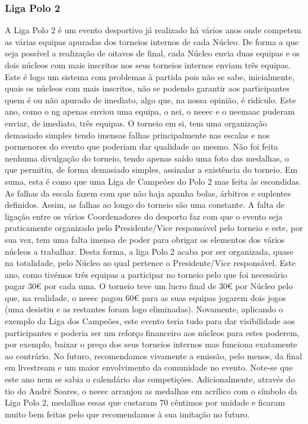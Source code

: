 
\subsubsection{Liga Polo 2}

A Liga Polo 2 é um evento desportivo já realizado há vários anos onde competem as várias equipas apuradas dos torneios internos de cada Núcleo. De forma a que seja possível a realização de oitavos de final, cada Núcleo envia duas equipas e os dois núcleos com mais inscritos nos seus torneios internos enviam três equipas. Este é logo um sistema com problemas à partida pois não se sabe, inicialmente, quais os núcleos com mais inscritos, não se podendo garantir aos participantes quem é ou não apurado de imediato, algo que, na nossa opinião, é ridículo. Este ano, como o \acrshort{ng} apenas enviou uma equipa, o \acrshort{nei}, o \acrshort{neeec} e o \acrshort{neemaac} puderam enviar, de imediato, três equipas. O torneio em si, tem uma organização demasiado simples tendo imensas falhas principalmente nas escalas e nos pormenores do evento que poderiam dar qualidade ao mesmo. Não foi feita nenhuma divulgação do torneio, tendo apenas saído uma foto das medalhas, o que permitiu, de forma demasiado simples, assinalar a existência do torneio. Em suma, esta é como que uma Liga de Campeões do Polo 2 mas feita às escondidas. As falhas da escala fazem com que não haja apanha bolas, árbitros e suplentes definidos. Assim, as falhas ao longo do torneio são uma constante. A falta de ligação entre os vários Coordenadores do desporto faz com que o evento seja praticamente organizado pelo Presidente/Vice responsável pelo torneio e este, por sua vez, tem uma falta imensa de poder para obrigar os elementos dos vários núcleos a trabalhar. Desta forma, a liga Polo 2 acaba por ser organizada, quase na totalidade, pelo Núcleo ao qual pertence o Presidente/Vice responsável. Este ano, como tivémos três equipas a participar no torneio pelo que foi necessário pagar 30€ por cada uma. O torneio teve um lucro final de 30€ por Núcleo pelo que, na realidade, o \acrshort{neeec} pagou 60€ para as suas equipas jogarem dois jogos (uma desistiu e as restantes foram logo eliminadas). Novamente, aplicando o exemplo da Liga dos Campeões, este evento teria tudo para dar visibilidade aos participantes e poderia ser um reforço financeiro aos núcleos para estes poderem, por exemplo, baixar o preço dos seus torneios internos mas funciona exatamente ao contrário. No futuro, recomendamos vivamente a emissão, pelo menos, da final em livestream e um maior envolvimento da comunidade no evento. Note-se que este ano nem se sabia o calendário das competições. Adicionalmente, através do tio do André Soares, o \acrshort{neeec} arranjou as medalhas em acrílico com o símbolo da Liga Polo 2, medalhas essas que custaram 70 cêntimos por unidade e ficaram muito bem feitas pelo que recomendamos à sua imitação no futuro.